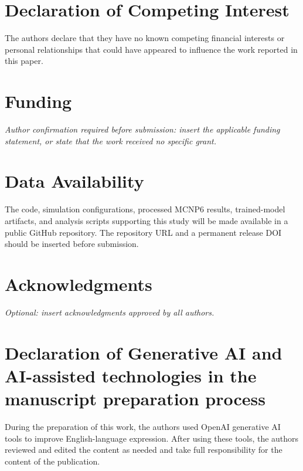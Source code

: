 \documentclass[preprint,12pt]{elsarticle}
\begin{document}
\section*{Declaration of Competing Interest}
The authors declare that they have no known competing financial interests or personal relationships that could have appeared to influence the work reported in this paper.

\section*{Funding}
\textit{Author confirmation required before submission: insert the applicable funding statement, or state that the work received no specific grant.}

\section*{Data Availability}
The code, simulation configurations, processed MCNP6 results, trained-model artifacts, and analysis scripts supporting this study will be made available in a public GitHub repository. The repository URL and a permanent release DOI should be inserted before submission.

\section*{Acknowledgments}
\textit{Optional: insert acknowledgments approved by all authors.}

\section*{Declaration of Generative AI and AI-assisted technologies in the manuscript preparation process}
During the preparation of this work, the authors used OpenAI generative AI tools to improve English-language expression. After using these tools, the authors reviewed and edited the content as needed and take full responsibility for the content of the publication.



\end{document}
